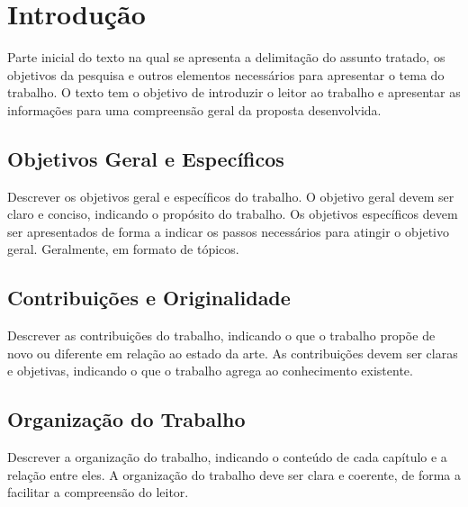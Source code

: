 
\chapter{Introdução}\label{chap:introducao} %

	Parte inicial do texto na qual se apresenta a delimitação do assunto tratado, os 
	objetivos da pesquisa e outros elementos necessários para apresentar o tema 
	do trabalho. O texto tem o objetivo de introduzir o leitor ao trabalho e 
	apresentar as informações para uma compreensão geral da proposta
	desenvolvida.

	\section{Objetivos Geral e Específicos}\label{sec:introducao:objetivos}

		Descrever os objetivos geral e específicos do trabalho. O objetivo
		geral devem ser claro e conciso, indicando o propósito do trabalho.
		Os objetivos específicos devem ser apresentados de forma a indicar
		os passos necessários para atingir o objetivo geral. Geralmente, em formato de tópicos.

	\section{Contribuições e Originalidade}\label{sec:introducao:contribuicoes}

		Descrever as contribuições do trabalho, indicando o que o trabalho
		propõe de novo ou diferente em relação ao estado da arte. As contribuições
		devem ser claras e objetivas, indicando o que o trabalho agrega ao conhecimento
		existente.
	
	\section{Organização do Trabalho}\label{sec:introducao:organizacao}

		Descrever a organização do trabalho, indicando o conteúdo de cada capítulo
		e a relação entre eles. A organização do trabalho deve ser clara e
		coerente, de forma a facilitar a compreensão do leitor.
